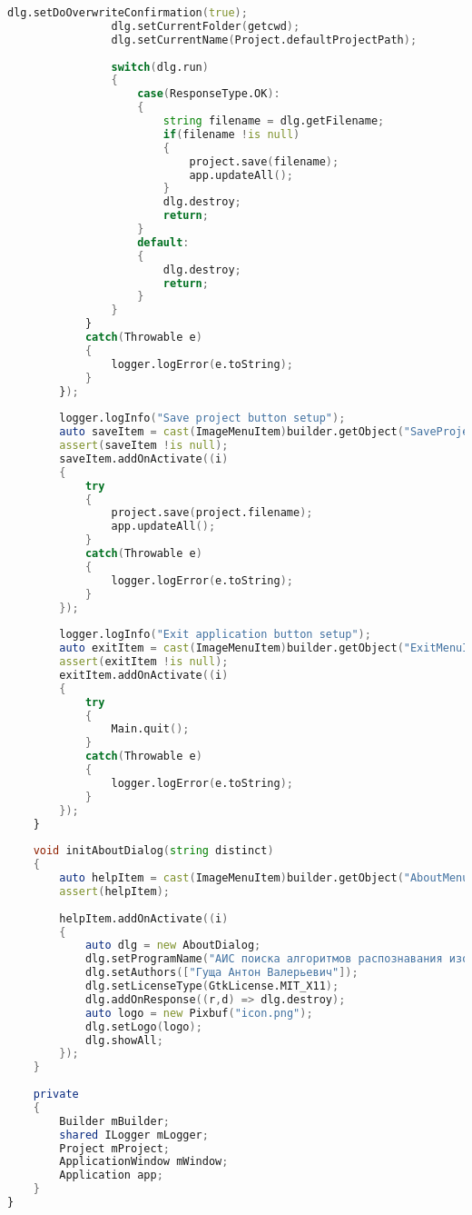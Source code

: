 \documentclass[russian,utf8,emptystyle]{eskdtext}
\begin{document}
\begin{lstlisting}[language=D]
                dlg.setDoOverwriteConfirmation(true);
                dlg.setCurrentFolder(getcwd);
                dlg.setCurrentName(Project.defaultProjectPath);
           
                switch(dlg.run)
                {
                    case(ResponseType.OK):
                    {
                        string filename = dlg.getFilename;
                        if(filename !is null)
                        {
                            project.save(filename);
                            app.updateAll();
                        }
                        dlg.destroy;
                        return;
                    }
                    default:
                    {
                        dlg.destroy;
                        return;
                    }
                } 
            }
            catch(Throwable e)
            {
                logger.logError(e.toString);
            }
        });
        
        logger.logInfo("Save project button setup");
        auto saveItem = cast(ImageMenuItem)builder.getObject("SaveProjectMenuItem"~distinct);
        assert(saveItem !is null);
        saveItem.addOnActivate((i)
        {
            try
            {
                project.save(project.filename);
                app.updateAll();
            }
            catch(Throwable e)
            {
                logger.logError(e.toString);
            }
        });
        
        logger.logInfo("Exit application button setup");
        auto exitItem = cast(ImageMenuItem)builder.getObject("ExitMenuItem"~distinct);
        assert(exitItem !is null);
        exitItem.addOnActivate((i)
        {
            try
            {
                Main.quit();
            }
            catch(Throwable e)
            {
                logger.logError(e.toString);
            }
        });
    }
    
    void initAboutDialog(string distinct)
    {
    	auto helpItem = cast(ImageMenuItem)builder.getObject("AboutMenuItem"~distinct);
    	assert(helpItem);
    	
    	helpItem.addOnActivate((i)
		{
			auto dlg = new AboutDialog;
			dlg.setProgramName("АИС поиска алгоритмов распознавания изоморфизма графов\n" "Курсовое проектирование МГТУ им. Н.Э.Баумана\n" "Научный руководитель: Филиппович Юрий Николаевич");
			dlg.setAuthors(["Гуща Антон Валерьевич"]);
			dlg.setLicenseType(GtkLicense.MIT_X11);
			dlg.addOnResponse((r,d) => dlg.destroy);
			auto logo = new Pixbuf("icon.png");
			dlg.setLogo(logo);
			dlg.showAll;
		});
    }
    
    private
    {
        Builder mBuilder;
        shared ILogger mLogger;
        Project mProject;
        ApplicationWindow mWindow;
        Application app;
    }
}
\end{lstlisting}
\end{document}

